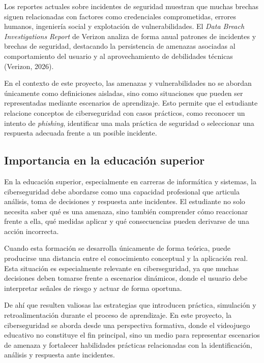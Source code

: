 Los reportes actuales sobre incidentes de seguridad muestran que muchas brechas siguen relacionadas con factores como credenciales comprometidas, errores humanos, ingeniería social y explotación de vulnerabilidades. El \textit{Data Breach Investigations Report} de Verizon analiza de forma anual patrones de incidentes y brechas de seguridad, destacando la persistencia de amenazas asociadas al comportamiento del usuario y al aprovechamiento de debilidades técnicas (Verizon, 2026).

En el contexto de este proyecto, las amenazas y vulnerabilidades no se abordan únicamente como definiciones aisladas, sino como situaciones que pueden ser representadas mediante escenarios de aprendizaje. Esto permite que el estudiante relacione conceptos de ciberseguridad con casos prácticos, como reconocer un intento de \textit{phishing}, identificar una mala práctica de seguridad o seleccionar una respuesta adecuada frente a un posible incidente.

\subsection{Importancia en la educación superior}

En la educación superior, especialmente en carreras de informática y sistemas, la ciberseguridad debe abordarse como una capacidad profesional que articula análisis, toma de decisiones y respuesta ante incidentes. El estudiante no solo necesita saber qué es una amenaza, sino también comprender cómo reaccionar frente a ella, qué medidas aplicar y qué consecuencias pueden derivarse de una acción incorrecta.

Cuando esta formación se desarrolla únicamente de forma teórica, puede producirse una distancia entre el conocimiento conceptual y la aplicación real. Esta situación es especialmente relevante en ciberseguridad, ya que muchas decisiones deben tomarse frente a escenarios dinámicos, donde el usuario debe interpretar señales de riesgo y actuar de forma oportuna.

De ahí que resulten valiosas las estrategias que introducen práctica, simulación y retroalimentación durante el proceso de aprendizaje. En este proyecto, la ciberseguridad se aborda desde una perspectiva formativa, donde el videojuego educativo no constituye el fin principal, sino un medio para representar escenarios de amenaza y fortalecer habilidades prácticas relacionadas con la identificación, análisis y respuesta ante incidentes.

